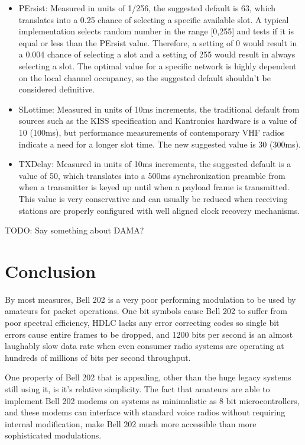 \documentclass[12pt,letterpaper]{article}
\begin{document}
\begin{itemize}
	\item PErsist: Measured in units of 1/256, the suggested default is
		63, which translates into a 0.25 chance of selecting a specific available
		slot. A typical implementation selects random number in the range
		[0,255] and tests if it is equal or less than the PErsist value.
		Therefore, a setting of 0 would result in a 0.004 chance of selecting 
		a slot and a setting of 255 would result in always selecting a slot.
		The optimal value for a specific network is highly dependent on the
		local channel occupancy, so the suggested default shouldn't
		be considered definitive.
	\item SLottime: Measured in units of 10ms increments, the traditional
		default from sources such as the KISS specification and 
		Kantronics hardware is a value of 10 (100ms), 
		but performance measurements of contemporary VHF radios 
		indicate a need for a longer slot time. 
		The new suggested value is 30 (300ms).
	\item TXDelay: Measured in units of 10ms increments, the suggested
		default is a value of 50, which translates into a 500ms synchronization
		preamble from when a transmitter is keyed up until when a payload
		frame is transmitted.
		This value is very conservative and can usually be reduced when
		receiving stations are properly configured with
		well aligned clock recovery mechanisms.
\end{itemize}

TODO: Say something about DAMA?

\section{Conclusion}


By most measures, Bell 202 is a very poor performing modulation to
be used by amateurs for packet operations. 
One bit symbols cause Bell 202 to suffer from poor spectral efficiency,
HDLC lacks any error correcting codes so single bit errors cause entire 
frames to be dropped, and 1200 bits per second is an almost laughably slow
data rate when even consumer radio systems are operating at hundreds of millions
of bits per second throughput.

One property of Bell 202 that is appealing, other than the 
huge legacy systems still using it, is it's relative simplicity.
The fact that amateurs are able to implement Bell 202 modems on
systems as minimalistic as 8 bit microcontrollers, and these modems can 
interface with standard voice radios without requiring internal modification, 
make Bell 202 much more accessible than more sophisticated modulations.
\end{document}
